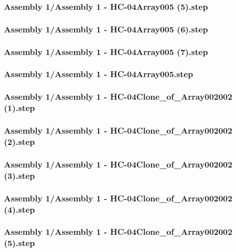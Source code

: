 \documentclass[a4paper,12pt]{article}
\begin{document}
\begin{lstlising}[language=C++]
\subsubsection{Assembly 1/Assembly 1 - HC-04Array005 (5).step}

\subsubsection{Assembly 1/Assembly 1 - HC-04Array005 (6).step}

\subsubsection{Assembly 1/Assembly 1 - HC-04Array005 (7).step}

\subsubsection{Assembly 1/Assembly 1 - HC-04Array005.step}

\subsubsection{Assembly 1/Assembly 1 - HC-04Clone_of_Array002002 (1).step}

\subsubsection{Assembly 1/Assembly 1 - HC-04Clone_of_Array002002 (2).step}

\subsubsection{Assembly 1/Assembly 1 - HC-04Clone_of_Array002002 (3).step}

\subsubsection{Assembly 1/Assembly 1 - HC-04Clone_of_Array002002 (4).step}

\subsubsection{Assembly 1/Assembly 1 - HC-04Clone_of_Array002002 (5).step}


\end{lstlising}
\end{document}
